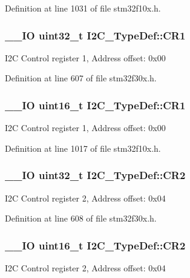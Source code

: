 Definition at line 1031 of file stm32f10x.\-h.

\hypertarget{struct_i2_c___type_def_a91782f7b81475b0e3c3779273abd26aa}{
\subsubsection[{C\-R1}]{\setlength{\rightskip}{0pt plus 5cm}\-\_\-\-\_\-\-I\-O {\bf uint32\-\_\-t} I2\-C\-\_\-\-Type\-Def\-::\-C\-R1}}\label{struct_i2_c___type_def_a91782f7b81475b0e3c3779273abd26aa}
I2\-C Control register 1, Address offset\-: 0x00 

Definition at line 607 of file stm32f30x.\-h.

\hypertarget{struct_i2_c___type_def_ad35ea0b199cefb757de20e9b78168534}{
\subsubsection[{C\-R1}]{\setlength{\rightskip}{0pt plus 5cm}\-\_\-\-\_\-\-I\-O {\bf uint16\-\_\-t} I2\-C\-\_\-\-Type\-Def\-::\-C\-R1}}\label{struct_i2_c___type_def_ad35ea0b199cefb757de20e9b78168534}
I2\-C Control register 1, Address offset\-: 0x00 

Definition at line 1017 of file stm32f10x.\-h.

\hypertarget{struct_i2_c___type_def_a29eb47db03d5ad7e9b399f8895f1768c}{
\subsubsection[{C\-R2}]{\setlength{\rightskip}{0pt plus 5cm}\-\_\-\-\_\-\-I\-O {\bf uint32\-\_\-t} I2\-C\-\_\-\-Type\-Def\-::\-C\-R2}}\label{struct_i2_c___type_def_a29eb47db03d5ad7e9b399f8895f1768c}
I2\-C Control register 2, Address offset\-: 0x04 

Definition at line 608 of file stm32f30x.\-h.

\hypertarget{struct_i2_c___type_def_ac8bff45acc455489620d50e697a24c9d}{
\subsubsection[{C\-R2}]{\setlength{\rightskip}{0pt plus 5cm}\-\_\-\-\_\-\-I\-O {\bf uint16\-\_\-t} I2\-C\-\_\-\-Type\-Def\-::\-C\-R2}}\label{struct_i2_c___type_def_ac8bff45acc455489620d50e697a24c9d}
I2\-C Control register 2, Address offset\-: 0x04 

